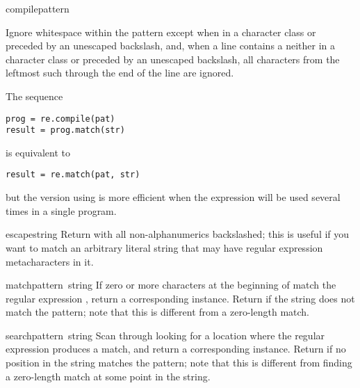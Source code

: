 \begin{funcdesc}{compile}{pattern}
\begin{itemize}
{Ignore whitespace within the pattern
except when in a character class or preceded by an unescaped
backslash, and, when a line contains a \code{\#} neither in a character
class or preceded by an unescaped backslash, all characters from the
leftmost such \code{\#} through the end of the line are ignored.  }

\end{itemize}

  The sequence
%
\bcode\begin{verbatim}
prog = re.compile(pat)
result = prog.match(str)
\end{verbatim}\ecode
%
is equivalent to
%
\bcode\begin{verbatim}
result = re.match(pat, str)
\end{verbatim}\ecode
%
but the version using  is more efficient when the
expression will be used several times in a single program.
\end{funcdesc}

\begin{funcdesc}{escape}{string}
  Return  with all non-alphanumerics backslashed; this is
  useful if you want to match an arbitrary literal string that may have
  regular expression metacharacters in it.
\end{funcdesc}

\begin{funcdesc}{match}{pattern\, string}
  If zero or more characters at the beginning of  match
  the regular expression , return a corresponding
   instance.  Return  if the string does not
  match the pattern; note that this is different from a zero-length
  match.
\end{funcdesc}

\begin{funcdesc}{search}{pattern\, string}
  Scan through  looking for a location where the regular
  expression  produces a match, and return a corresponding  instance.  
  Return  if no
  position in the string matches the pattern; note that this is
  different from finding a zero-length match at some point in the string.
\end{funcdesc}

